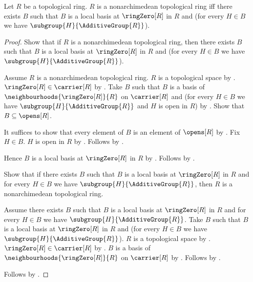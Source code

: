 \begin{theorem}\label{nonarchimedean_topological_ring_iff_open_local_basis}
    Let $R$ be a topological ring.
    $R$ is a nonarchimedean topological ring iff
        there exists $B$ such that
            $B$ is a local basis at $\ringZero[R]$ in $R$ and
            (for every $H\in B$ we have
                $\subgroup{H}{\AdditiveGroup{R}}$).
\end{theorem}
\begin{proof}
    Show that if $R$ is a nonarchimedean topological ring, then
        there exists $B$ such that
            $B$ is a local basis at $\ringZero[R]$ in $R$ and
            (for every $H\in B$ we have
                $\subgroup{H}{\AdditiveGroup{R}}$).
    \begin{subproof}
        Assume $R$ is a nonarchimedean topological ring.
        $R$ is a topological space by
            .
        $\ringZero[R]\in\carrier[R]$ by .
        Take $B$ such that $B$ is a basis of
            $\neighbourhoods{\ringZero[R]}{R}$ on $\carrier[R]$ and
            (for every $H\in B$ we have
                $\subgroup{H}{\AdditiveGroup{R}}$ and $H$ is open in $R$)
            by .
        Show that $B\subseteq\opens[R]$.
        \begin{subproof}
            It suffices to show that every element of $B$ is an element of
                $\opens[R]$ by .
            Fix $H\in B$.
            $H$ is open in $R$ by \auto.
            Follows by .
        \end{subproof}
        Hence $B$ is a local basis at $\ringZero[R]$ in $R$ by
            .
        Follows by \auto.
    \end{subproof}
    Show that if there exists $B$ such that
        $B$ is a local basis at $\ringZero[R]$ in $R$ and
        for every $H\in B$ we have
            $\subgroup{H}{\AdditiveGroup{R}}$, then
        $R$ is a nonarchimedean topological ring.
    \begin{subproof}
        Assume there exists $B$ such that
            $B$ is a local basis at $\ringZero[R]$ in $R$ and
            for every $H\in B$ we have
                $\subgroup{H}{\AdditiveGroup{R}}$.
        Take $B$ such that
            $B$ is a local basis at $\ringZero[R]$ in $R$ and
            (for every $H\in B$ we have
                $\subgroup{H}{\AdditiveGroup{R}}$).
        $R$ is a topological space by
            .
        $\ringZero[R]\in\carrier[R]$ by .
        $B$ is a basis of
            $\neighbourhoods{\ringZero[R]}{R}$ on $\carrier[R]$ by
            .
        Follows by
            .
    \end{subproof}
    Follows by \auto.
\end{proof}

